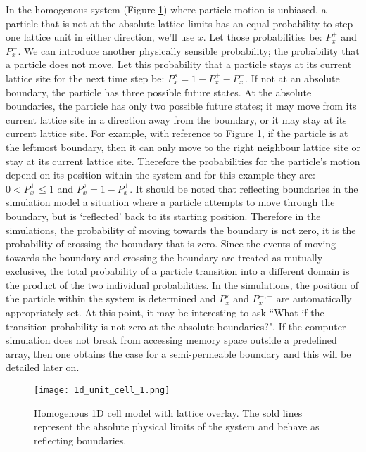 	In the homogenous system (Figure \ref{fig:1d_unit_cell_1.png}) where particle motion is unbiased, a particle that is not at the absolute lattice limits has an equal probability to step one lattice unit in either direction, we'll use $ x $. Let those probabilities be: $ P_x^+ $ and $ P_x^- $. We can introduce another physically sensible probability; the probability that a particle does not move. Let this probability that a particle stays at its current lattice site for the next time step be: $ P_x^s = 1 - P_x^+ - P_x^- $. If not at an absolute boundary, the particle has three possible future states. At the absolute boundaries, the particle has only two possible future states; it may move from its current lattice site in a direction away from the boundary, or it may stay at its current lattice site. For example, with reference to Figure \ref{fig:1d_unit_cell_1.png}, if the particle is at the leftmost boundary, then it can only move to the right neighbour lattice site or stay at its current lattice site. Therefore the probabilities for the particle's motion depend on its position within the system and for this example they are: $ 0 < P_x^+ \leq 1 $ and $ P_x^s = 1 - P_x^+ $. It should be noted that reflecting boundaries in the simulation model a situation where a particle attempts to move through the boundary, but is `reflected' back to its starting position. Therefore in the simulations, the probability of moving towards the boundary is not zero, it is the probability of crossing the boundary that is zero. Since the events of moving towards the boundary and crossing the boundary are treated as mutually exclusive, the total probability of a particle transition into a different domain is the product of the two individual probabilities. In the simulations, the position of the particle within the system is determined and $ P_x^s $ and $ P_x^{-,+} $ are automatically appropriately set. At this point, it may be interesting to ask ``What if the transition probability is not zero at the absolute boundaries?". If the computer simulation does not break from accessing memory space outside a predefined array, then one obtains the case for a semi-permeable boundary and this will be detailed later on.
	
	\begin{figure}[h]
		\centering
		\texttt{[image: 1d\_unit\_cell\_1.png]}
		\caption{Homogenous 1D cell model with lattice overlay. The sold lines represent the absolute physical limits of the system and behave as reflecting boundaries.}
		\label{fig:1d_unit_cell_1.png}
	\end{figure}	
	
